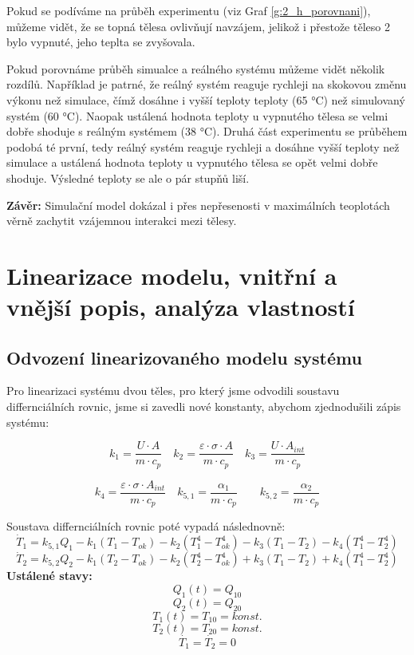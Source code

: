 \documentclass[12pt]{article} %
\begin{document}
Pokud se podíváme na průběh experimentu (viz Graf \ref{g:2_h_porovnani}), můžeme vidět, že se topná tělesa ovlivňují navzájem, jelikož i přestože těleso 2 bylo vypnuté, jeho teplta se zvyšovala. 

Pokud porovnáme průběh simualce a reálného systému můžeme vidět několik rozdílů. Například je patrné, že reálný systém reaguje rychleji na skokovou změnu výkonu než simulace, čímž dosáhne i vyšší teploty teploty (65 °C) než simulovaný systém (60 °C). Naopak ustálená hodnota teploty u vypnutého tělesa se velmi dobře shoduje s reálným systémem (38 °C).
Druhá část experimentu se průběhem podobá té první, tedy reálný systém reaguje rychleji a dosáhne vyšší teploty než simulace a ustálená hodnota teploty u vypnutého tělesa se opět velmi dobře shoduje.
Výsledné teploty se ale o pár stupňů liší.

\textbf{Závěr:} 
Simulační model dokázal i přes nepřesenosti v maximálních teoplotách věrně zachytit vzájemnou interakci mezi tělesy.


\section{Linearizace modelu, vnitřní a vnější popis, analýza vlastností}
\subsection{Odvození linearizovaného modelu systému}
Pro linearizaci systému dvou těles, pro který jsme odvodili soustavu differnciálních rovnic, jsme si zavedli nové konstanty, abychom zjednodušili zápis systému:

$$k_1 = \frac{U \cdot A}{m \cdot c_p} \quad k_2 = \frac{\varepsilon \cdot \sigma \cdot A}{m \cdot c_p} \quad k_3 = \frac{U \cdot A_{int}}{m \cdot c_p}$$

$$k_4 = \frac{\varepsilon \cdot \sigma \cdot A_{int}}{m \cdot c_p} \quad k_{5,1}= \frac{\alpha_1}{m \cdot c_p} \quad \quad k_{5,2}= \frac{\alpha_2}{m \cdot c_p}$$

Soustava differnciálních rovnic poté vypadá následnovně:
\begin{equation}
    \label{eq:konst_mod_2t_1}
\dot{T}_1 = k_{5,1} Q_1 - k_1(T_1 - T_{ok}) - k_2(T_1^4 - T_{ok}^4) - k_3(T_1 - T_2) - k_4(T_1^4 - T_2^4)
\end{equation}
\begin{equation}
    \label{eq:konst_mod_2t_2}
\dot{T}_2 = k_{5,2} Q_2 - k_1(T_2 - T_{ok}) - k_2(T_2^4 - T_{ok}^4) + k_3(T_1 - T_2) + k_4(T_1^4 - T_2^4)
\end{equation}
\textbf{Ustálené stavy:}
$$Q_1 (t) = Q_{10}$$
$$Q_2 (t) = Q_{20}$$
$$T_1 (t) = T_{10} = konst.$$
$$T_2 (t) = T_{20} = konst.$$
$$\dot{T_1} = \dot{T_2} = 0$$
\end{document}
